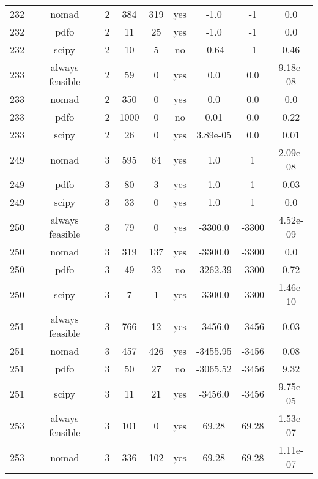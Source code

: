\begin{footnotesize}
\begin{center}
\begin{longtable}{ccccccccc}
232 &           nomad &  2 &    384 &    319 &     yes &        -1.0 &          -1 &      0.0\\
232 &            pdfo &  2 &     11 &     25 &     yes &        -1.0 &          -1 &      0.0\\
232 &           scipy &  2 &     10 &      5 &      no &       -0.64 &          -1 &     0.46\\
233 & always feasible &  2 &     59 &      0 &     yes &         0.0 &         0.0 & 9.18e-08\\
233 &           nomad &  2 &    350 &      0 &     yes &         0.0 &         0.0 &      0.0\\
233 &            pdfo &  2 &   1000 &      0 &      no &        0.01 &         0.0 &     0.22\\
233 &           scipy &  2 &     26 &      0 &     yes &    3.89e-05 &         0.0 &     0.01\\
249 &           nomad &  3 &    595 &     64 &     yes &         1.0 &           1 & 2.09e-08\\
249 &            pdfo &  3 &     80 &      3 &     yes &         1.0 &           1 &     0.03\\
249 &           scipy &  3 &     33 &      0 &     yes &         1.0 &           1 &      0.0\\
250 & always feasible &  3 &     79 &      0 &     yes &     -3300.0 &       -3300 & 4.52e-09\\
250 &           nomad &  3 &    319 &    137 &     yes &     -3300.0 &       -3300 &      0.0\\
250 &            pdfo &  3 &     49 &     32 &      no &    -3262.39 &       -3300 &     0.72\\
250 &           scipy &  3 &      7 &      1 &     yes &     -3300.0 &       -3300 & 1.46e-10\\
251 & always feasible &  3 &    766 &     12 &     yes &     -3456.0 &       -3456 &     0.03\\
251 &           nomad &  3 &    457 &    426 &     yes &    -3455.95 &       -3456 &     0.08\\
251 &            pdfo &  3 &     50 &     27 &      no &    -3065.52 &       -3456 &     9.32\\
251 &           scipy &  3 &     11 &     21 &     yes &     -3456.0 &       -3456 & 9.75e-05\\
253 & always feasible &  3 &    101 &      0 &     yes &       69.28 &       69.28 & 1.53e-07\\
253 &           nomad &  3 &    336 &    102 &     yes &       69.28 &       69.28 & 1.11e-07\\

\end{longtable}
\end{center}
\end{footnotesize}
